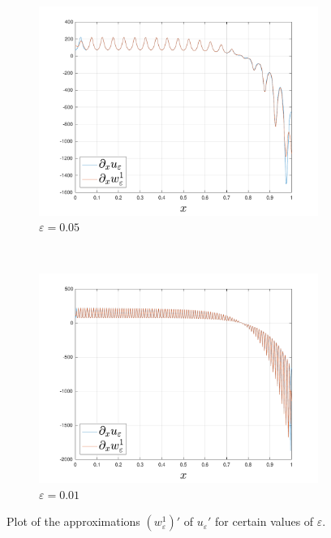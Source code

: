 \begin{example}
\begin{figure}[h!tb]
\begin{subfigure}[b]{0.5\textwidth}
        \includegraphics[width=\textwidth]{src/img/du_eps_dw_1_eps_3.pdf}
        \caption{$\varepsilon = 0.05$}
    \end{subfigure}
    ~ %
    \begin{subfigure}[b]{0.5\textwidth}
        \includegraphics[width=\textwidth]{src/img/du_eps_dw_1_eps_4.pdf}
        \caption{$\varepsilon = 0.01$}
    \end{subfigure}
    \caption{Plot of the approximations $(w_\varepsilon^1)'$ of $u_\varepsilon'$ for certain values of $\varepsilon$.}
    \label{fig:ex_2_plots_d}
	\end{figure}
	

\end{example}
